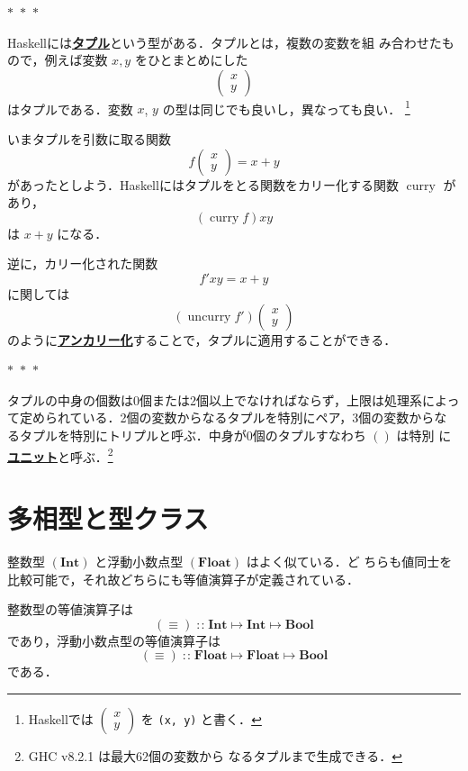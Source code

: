 \documentclass[a5paper,twoside,fleqn,draft]{jsbook}
\newcommand{\separator}{\begin{center}$*$~$*$~$*$\end{center}}
\newcommand{\programminglanguage}[1]{\textsf{#1}}
\newcommand{\haskell}{\programminglanguage{Haskell}}
\newcommand{\keyword}[1]{{\underline{\textbf{#1}}}}
\newcommand{\code}[1]{\texttt{#1}}
\newcommand{\mSpecialFunc}[1]{#1}
\DeclareMathOperator{\mCurry}{\mSpecialFunc{curry}}
\DeclareMathOperator{\mUncurry}{\mSpecialFunc{uncurry}}
\DeclareMathOperator{\mFuncArrow}{\mapsto}
\DeclareMathOperator{\mIn}{{:\!:}}
\newcommand{\mType}[1]{\mathbf{#1}} %
\newcommand{\mBoolType}{\mType{Bool}}
\newcommand{\mFloatType}{\mType{Float}}
\newcommand{\mIntType}{\mType{Int}}
\newcommand{\mPairWith}[2]{\begin{pmatrix}#1\\#2\end{pmatrix}}
\begin{document}
\separator

\haskell には\keyword{タプル}という型がある．タプルとは，複数の変数を組
み合わせたもので，例えば変数 $x,y$ をひとまとめにした
\begin{equation}
  \mPairWith{x}{y}
\end{equation}
はタプルである．変数 $x$, $y$ の型は同じでも良いし，異なっても良い．
\footnote{\haskell では $\mPairWith{x}{y}$ を \code{(x, y)} と書く．}

いまタプルを引数に取る関数
\begin{equation}
  f\mPairWith{x}{y}
  =x+y
\end{equation}
があったとしよう．\haskell にはタプルをとる関数をカリー化する関数
$\mCurry$ があり，
\begin{equation}
  (\mCurry f)xy
\end{equation}
は $x+y$ になる．

逆に，カリー化された関数
\begin{equation}
  f'xy
  =x+y
\end{equation}
に関しては
\begin{equation}
  (\mUncurry f')\mPairWith{x}{y}
\end{equation}
のように\keyword{アンカリー化}することで，タプルに適用することができる．

\separator

タプルの中身の個数は0個または2個以上でなければならず，上限は処理系によっ
て定められている．2個の変数からなるタプルを特別にペア，3個の変数からな
るタプルを特別にトリプルと呼ぶ．中身が0個のタプルすなわち $()$ は特別
に\keyword{ユニット}と呼ぶ．\footnote{GHC v8.2.1 は最大62個の変数から
  なるタプルまで生成できる．}

\section{多相型と型クラス}

整数型 $(\mIntType)$ と浮動小数点型 $(\mFloatType)$ はよく似ている．ど
ちらも値同士を比較可能で，それ故どちらにも等値演算子が定義されている．

整数型の等値演算子は
\begin{equation}
  (\equiv)
  \mIn\mIntType\mFuncArrow\mIntType\mFuncArrow\mBoolType
\end{equation}
であり，浮動小数点型の等値演算子は
\begin{equation}
  (\equiv)
  \mIn\mFloatType\mFuncArrow\mFloatType\mFuncArrow\mBoolType
\end{equation}
である．
\end{document}
